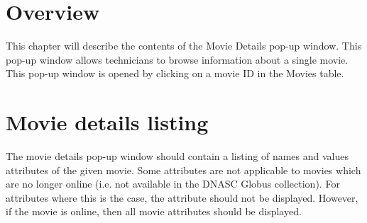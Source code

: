 
\section{Overview}

This chapter will describe the contents of the Movie Details pop-up window. This pop-up
window allows technicians to browse information about a single movie. This pop-up window 
is opened by clicking on a movie ID in the Movies table.

\section{Movie details listing}

The movie details pop-up window should contain a listing of names and values attributes 
of the given movie. Some attributes are not applicable to movies which are no 
longer online (i.e. not available in the DNASC Globus collection). For attributes where
this is the case, the attribute should not be displayed. However, if the movie is online,
then all movie attributes should be displayed.

